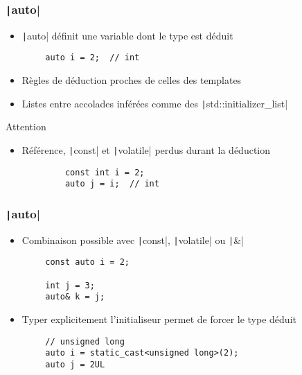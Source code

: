 \documentclass[C++.tex]{subfiles}
\begin{document}
\begin{frame}[fragile]
	\frametitle{\texttt|auto|}
	\begin{itemize}
		\item \texttt|auto| définit une variable dont le type est déduit
	\end{itemize}

	\begin{verbatim}
		auto i = 2;  // int
	\end{verbatim}

	\begin{itemize}
		\item Règles de déduction proches de celles des templates
		\item Listes entre accolades inférées comme des \texttt|std::initializer_list|
	\end{itemize}

	\begin{alertblock}{Attention}
		\begin{itemize}
			\item Référence, \texttt|const| et \texttt|volatile| perdus durant la déduction
		\end{itemize}

		\begin{verbatim}
			const int i = 2;
			auto j = i;  // int
		\end{verbatim}
	\end{alertblock}
\end{frame}

\begin{frame}[fragile]
	\frametitle{\texttt|auto|}
	\begin{itemize}
		\item Combinaison possible avec \texttt|const|, \texttt|volatile| ou \texttt|&|
	\end{itemize}

	\begin{verbatim}
		const auto i = 2;

		int j = 3;
		auto& k = j;
	\end{verbatim}

	\begin{itemize}
		\item Typer explicitement l'initialiseur permet de forcer le type déduit
	\end{itemize}

	\begin{verbatim}
		// unsigned long
		auto i = static_cast<unsigned long>(2);
		auto j = 2UL
	\end{verbatim}
\end{frame}
\end{document}
